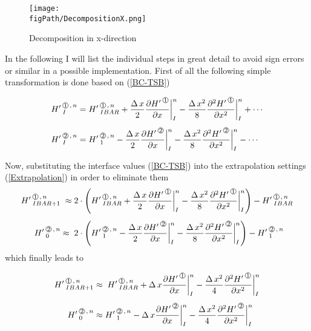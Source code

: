 \begin{figure}[H]
\begin{center}
\texttt{[image: \\figPath/DecompositionX.png]}
\end{center}
\caption{Decomposition in x-direction}
\label{FIG_DecompositionX}
\end{figure}
In the following I will list the individual steps in great detail to avoid sign errors or similar in a possible implementation. 
First of all the following simple transformation is done based on (\ref{BC-TSB})


\begin{align}
\label{BC-TSB}
\HL{I}{1}{n} & = \HL{IBAR}{1}{n}  + \frac{\DX}{2} \frac{\HPN{1}} {\DXP} \bigg|_{I}^n 
                                                      - \frac{\DXT}{8} \frac{\HPNT{1}} {\DXPT} \bigg|_{I}^n  + \cdots  \\[1ex]
\HL{I}{2}{n} & =  \HL{1}{2}{n}  - \frac{\DX}{2} \frac{\HPN{2}} {\DXP} \bigg|_{I}^n 
                                                - \frac{\DXT}{8}\frac{\HPNT{2}} {\DXPT} \bigg|_{I}^n  - \cdots         \nonumber                                            
\end{align}


Now, substituting the interface values (\ref{BC-TSB}) into the extrapolation settings (\ref{Extrapolation}) in order to eliminate them
\begin{align}
\HL{IBAR+1}{1}{n} & \; \approx 2 \cdot \left( \HL{IBAR}{1}{n}  + \frac{\DX}{2} \frac{\HPN{1}} {\DXP} \bigg|_{I}^n 
                                                      - \frac{\DXT}{8} \frac{\HPNT{1}} {\DXPT} \bigg|_{I}^n  \right) -  \HL{IBAR}{1}{n} \label{BC-TSD}
 \\[1ex]
\HL{0}{2}{n} & \approx \; 2 \cdot \left( \HL{1}{2}{n}  - \frac{\DX}{2} \frac{\HPN{2}} {\DXP} \bigg|_{I}^n 
                                                - \frac{\DXT}{8}\frac{\HPNT{2}} {\DXPT} \bigg|_{I}^n \right)    -  \HL{1}{2}{n}      \nonumber                                           
\end{align}
which finally leads to

\begin{align}
\HL{IBAR+1}{1}{n} & \approx \;  \HL{IBAR}{1}{n}  + \DX \frac{\HPN{1}} {\DXP} \bigg|_{I}^n 
                                                      - \frac{\DXT}{4} \frac{\HPNT{1}} {\DXPT} \bigg|_{I}^n  \label{BC-TSD}
 \\[1ex]
\HL{0}{2}{n} & \approx  \HL{1}{2}{n}  - \DX \frac{\HPN{2}} {\DXP} \bigg|_{I}^n 
                                                - \frac{\DXT}{4}\frac{\HPNT{2}} {\DXPT} \bigg|_{I}^n     \nonumber                                           
\end{align}

